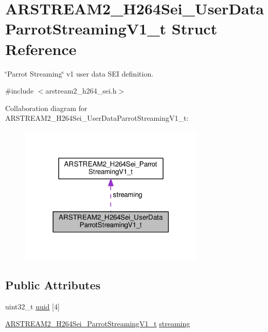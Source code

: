 \hypertarget{struct_a_r_s_t_r_e_a_m2___h264_sei___user_data_parrot_streaming_v1__t}{}\section{A\+R\+S\+T\+R\+E\+A\+M2\+\_\+\+H264\+Sei\+\_\+\+User\+Data\+Parrot\+Streaming\+V1\+\_\+t Struct Reference}
\label{struct_a_r_s_t_r_e_a_m2___h264_sei___user_data_parrot_streaming_v1__t}


\char`\"{}\+Parrot Streaming\char`\"{} v1 user data S\+EI definition.  




{\ttfamily \#include $<$arstream2\+\_\+h264\+\_\+sei.\+h$>$}



Collaboration diagram for A\+R\+S\+T\+R\+E\+A\+M2\+\_\+\+H264\+Sei\+\_\+\+User\+Data\+Parrot\+Streaming\+V1\+\_\+t\+:
\nopagebreak
\begin{figure}[H]
\begin{center}
\leavevmode
\includegraphics[width=248pt]{struct_a_r_s_t_r_e_a_m2___h264_sei___user_data_parrot_streaming_v1__t__coll__graph}
\end{center}
\end{figure}
\subsection*{Public Attributes}
\begin{DoxyCompactItemize}
\item 
uint32\+\_\+t \hyperlink{struct_a_r_s_t_r_e_a_m2___h264_sei___user_data_parrot_streaming_v1__t_a107c8923411c528a6434cd4253a34a0d}{uuid} \mbox{[}4\mbox{]}
\item 
\hyperlink{struct_a_r_s_t_r_e_a_m2___h264_sei___parrot_streaming_v1__t}{A\+R\+S\+T\+R\+E\+A\+M2\+\_\+\+H264\+Sei\+\_\+\+Parrot\+Streaming\+V1\+\_\+t} \hyperlink{struct_a_r_s_t_r_e_a_m2___h264_sei___user_data_parrot_streaming_v1__t_a5d36a1632f79e1f34c5bbdccb036bbe7}{streaming}
\end{DoxyCompactItemize}


